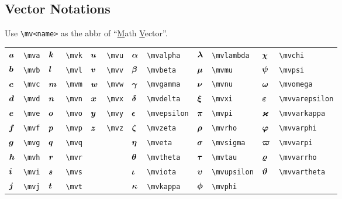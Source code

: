 \documentclass{article}
\begin{document}
\subsection{Vector Notations}
Use \lstinline`\mv<name>` as the abbr of ``\underline{M}ath \underline{V}ector''.

\begin{tabular}{*{12}{l}}
${\bm a}$ & \lstinline`\mva` & ${\bm k}$ & \lstinline`\mvk` & ${\bm u}$ & \lstinline`\mvu` & ${\bm \alpha}$ & \lstinline`\mvalpha` & ${\bm \lambda}$ & \lstinline`\mvlambda` & ${\bm \chi}$ & \lstinline`\mvchi`\\
${\bm b}$ & \lstinline`\mvb` & ${\bm l}$ & \lstinline`\mvl` & ${\bm v}$ & \lstinline`\mvv` & ${\bm \beta}$ & \lstinline`\mvbeta` & ${\bm \mu}$ & \lstinline`\mvmu` & ${\bm \psi}$ & \lstinline`\mvpsi`\\
${\bm c}$ & \lstinline`\mvc` & ${\bm m}$ & \lstinline`\mvm` & ${\bm w}$ & \lstinline`\mvw` & ${\bm \gamma}$ & \lstinline`\mvgamma` & ${\bm \nu}$ & \lstinline`\mvnu` & ${\bm \omega}$ & \lstinline`\mvomega`\\
${\bm d}$ & \lstinline`\mvd` & ${\bm n}$ & \lstinline`\mvn` & ${\bm x}$ & \lstinline`\mvx` & ${\bm \delta}$ & \lstinline`\mvdelta` & ${\bm \xi}$ & \lstinline`\mvxi` & ${\bm \varepsilon}$ & \lstinline`\mvvarepsilon`\\
${\bm e}$ & \lstinline`\mve` & ${\bm o}$ & \lstinline`\mvo` & ${\bm y}$ & \lstinline`\mvy` & ${\bm \epsilon}$ & \lstinline`\mvepsilon` & ${\bm \pi}$ & \lstinline`\mvpi` & ${\bm \varkappa}$ & \lstinline`\mvvarkappa`\\
${\bm f}$ & \lstinline`\mvf` & ${\bm p}$ & \lstinline`\mvp` & ${\bm z}$ & \lstinline`\mvz` & ${\bm \zeta}$ & \lstinline`\mvzeta` & ${\bm \rho}$ & \lstinline`\mvrho` & ${\bm \varphi}$ & \lstinline`\mvvarphi`\\
${\bm g}$ & \lstinline`\mvg` & ${\bm q}$ & \lstinline`\mvq` &  &  & ${\bm \eta}$ & \lstinline`\mveta` & ${\bm \sigma}$ & \lstinline`\mvsigma` & ${\bm \varpi}$ & \lstinline`\mvvarpi`\\
${\bm h}$ & \lstinline`\mvh` & ${\bm r}$ & \lstinline`\mvr` &  &  & ${\bm \theta}$ & \lstinline`\mvtheta` & ${\bm \tau}$ & \lstinline`\mvtau` & ${\bm \varrho}$ & \lstinline`\mvvarrho`\\
${\bm i}$ & \lstinline`\mvi` & ${\bm s}$ & \lstinline`\mvs` &  &  & ${\bm \iota}$ & \lstinline`\mviota` & ${\bm \upsilon}$ & \lstinline`\mvupsilon` & ${\bm \vartheta}$ & \lstinline`\mvvartheta`\\
${\bm j}$ & \lstinline`\mvj` & ${\bm t}$ & \lstinline`\mvt` &  &  & ${\bm \kappa}$ & \lstinline`\mvkappa` & ${\bm \phi}$ & \lstinline`\mvphi` & \\
\end{tabular}
\end{document}
